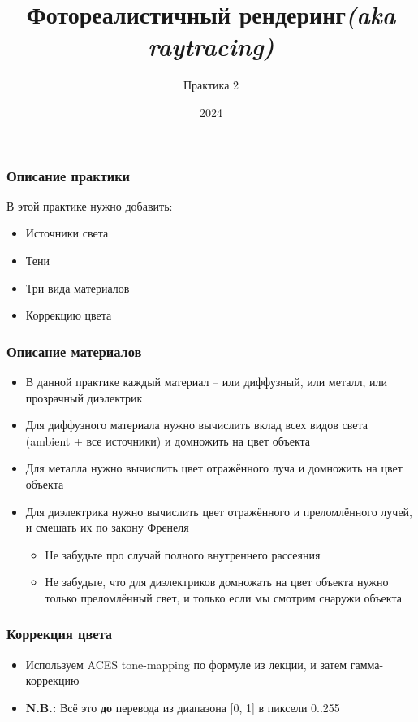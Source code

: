 \documentclass[10pt]{beamer}
\title{Фотореалистичный рендеринг\quad\quad\quad\quad\quad\quad \textit{(aka raytracing)}}
\subtitle{Практика 2}
\date{2024}
\begin{document}
\frame{\titlepage}

\begin{frame}[fragile]
\frametitle{Описание практики}
В этой практике нужно добавить:
\begin{itemize}
\item Источники света
\item Тени
\item Три вида материалов
\item Коррекцию цвета
\end{itemize}
\end{frame}

\begin{frame}[fragile]
\frametitle{Описание материалов}
\begin{itemize}
\item В данной практике каждый материал -- или диффузный, или металл, или прозрачный диэлектрик
\pause
\item Для диффузного материала нужно вычислить вклад всех видов света (ambient + все источники) и домножить на цвет объекта
\pause
\item Для металла нужно вычислить цвет отражённого луча и домножить на цвет объекта
\pause
\item Для диэлектрика нужно вычислить цвет отражённого и преломлённого лучей, и смешать их по закону Френеля
\pause
\begin{itemize}
\item Не забудьте про случай полного внутреннего рассеяния
\pause
\item Не забудьте, что для диэлектриков домножать на цвет объекта нужно только преломлённый свет, и только если мы смотрим снаружи объекта
\end{itemize}
\end{itemize}
\end{frame}

\begin{frame}[fragile]
\frametitle{Коррекция цвета}
\begin{itemize}
\item Используем ACES tone-mapping по формуле из лекции, и затем гамма-коррекцию
\pause
\item \alert{\textbf{N.B.:}} Всё это \textbf{до} перевода из диапазона [0, 1] в пиксели 0..255
\end{itemize}
\end{frame}
\end{document}
